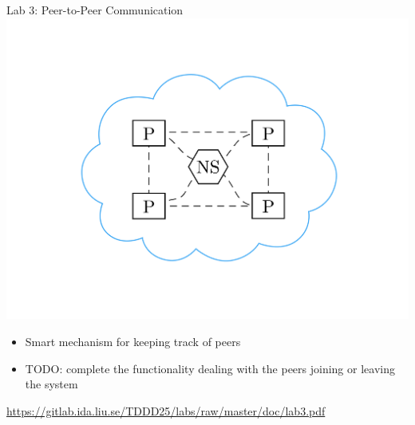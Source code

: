 \documentclass[compress,xcolor=table]{beamer}
\begin{document}
\begin{frame}{Lab 3: Peer-to-Peer Communication}
  \centering
  \includegraphics[scale=0.10,page=1]{include/assets/chat}
  \begin{itemize}
    \item Smart mechanism for keeping track of peers
    \item \alert{TODO}: complete the functionality dealing with the peers
    joining or leaving the system
  \end{itemize}
  \begin{center}
    \scriptsize \url{https://gitlab.ida.liu.se/TDDD25/labs/raw/master/doc/lab3.pdf}
  \end{center}
\end{frame}
\end{document}
